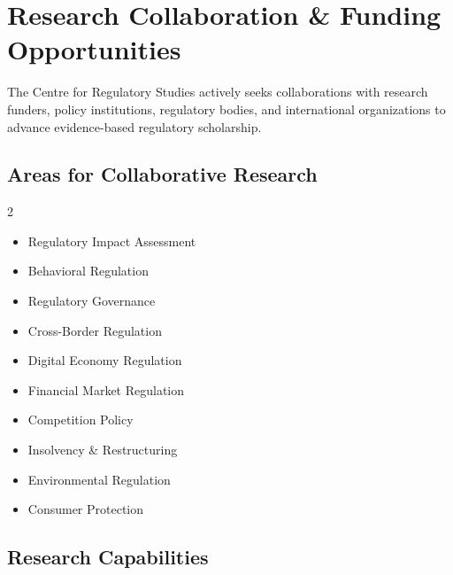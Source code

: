 \documentclass[11pt,a4paper]{article}
\begin{document}
\clearpage

\section{Research Collaboration \& Funding Opportunities}

The Centre for Regulatory Studies actively seeks collaborations with research funders, policy institutions, regulatory bodies, and international organizations to advance evidence-based regulatory scholarship.

\vspace{0.5cm}

\subsection*{Areas for Collaborative Research}

\begin{tcolorbox}[colback=goldthread!10,colframe=goldthread,arc=2mm]
\begin{multicols}{2}
\begin{itemize}[leftmargin=*,noitemsep]
    \item Regulatory Impact Assessment
    \item Behavioral Regulation
    \item Regulatory Governance
    \item Cross-Border Regulation
    \item Digital Economy Regulation
    \item Financial Market Regulation
    \item Competition Policy
    \item Insolvency \& Restructuring
    \item Environmental Regulation
    \item Consumer Protection
\end{itemize}
\end{multicols}
\end{tcolorbox}

\vspace{0.5cm}

\subsection*{Research Capabilities}
\end{document}

